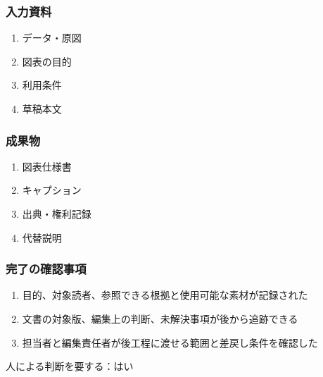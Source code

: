 \documentclass[a4paper,11pt]{article}
\begin{document}
\subsubsection*{入力資料}
\begin{enumerate}[leftmargin=2em,itemsep=0.35em]
\item データ・原図
\item 図表の目的
\item 利用条件
\item 草稿本文
\end{enumerate}
\subsubsection*{成果物}
\begin{enumerate}[leftmargin=2em,itemsep=0.35em]
\item 図表仕様書
\item キャプション
\item 出典・権利記録
\item 代替説明
\end{enumerate}
\subsubsection*{完了の確認事項}
\begin{enumerate}[leftmargin=2em,itemsep=0.35em]
\item 目的、対象読者、参照できる根拠と使用可能な素材が記録された
\item 文書の対象版、編集上の判断、未解決事項が後から追跡できる
\item 担当者と編集責任者が後工程に渡せる範囲と差戻し条件を確認した
\end{enumerate}
\par 人による判断を要する：はい\par\medskip
\end{document}
